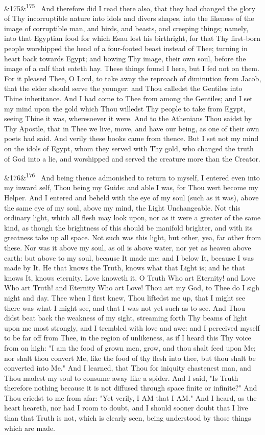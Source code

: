 \documentclass[12pt]{article}
\newcommand{\para}[1][]{\par\noindent\ifx&#1&\else\textsuperscript{\footnotesize #1}~\fi}
\begin{document}
\para[175] And therefore did I read there also, that they had changed the glory of Thy incorruptible nature into idols and divers shapes, into the likeness of the image of corruptible man, and birds, and beasts, and creeping things; namely, into that Egyptian food for which Esau lost his birthright, for that Thy first-born people worshipped the head of a four-footed beast instead of Thee; turning in heart back towards Egypt; and bowing Thy image, their own soul, before the image of a calf that eateth hay. These things found I here, but I fed not on them. For it pleased Thee, O Lord, to take away the reproach of diminution from Jacob, that the elder should serve the younger: and Thou calledst the Gentiles into Thine inheritance. And I had come to Thee from among the Gentiles; and I set my mind upon the gold which Thou willedst Thy people to take from Egypt, seeing Thine it was, wheresoever it were. And to the Athenians Thou saidst by Thy Apostle, that in Thee we live, move, and have our being, as one of their own poets had said. And verily these books came from thence. But I set not my mind on the idols of Egypt, whom they served with Thy gold, who changed the truth of God into a lie, and worshipped and served the creature more than the Creator.

\para[176] And being thence admonished to return to myself, I entered even into my inward self, Thou being my Guide: and able I was, for Thou wert become my Helper. And I entered and beheld with the eye of my soul (such as it was), above the same eye of my soul, above my mind, the Light Unchangeable. Not this ordinary light, which all flesh may look upon, nor as it were a greater of the same kind, as though the brightness of this should be manifold brighter, and with its greatness take up all space. Not such was this light, but other, yea, far other from these. Nor was it above my soul, as oil is above water, nor yet as heaven above earth: but above to my soul, because It made me; and I below It, because I was made by It. He that knows the Truth, knows what that Light is; and he that knows It, knows eternity. Love knoweth it. O Truth Who art Eternity! and Love Who art Truth! and Eternity Who art Love! Thou art my God, to Thee do I sigh night and day. Thee when I first knew, Thou liftedst me up, that I might see there was what I might see, and that I was not yet such as to see. And Thou didst beat back the weakness of my sight, streaming forth Thy beams of light upon me most strongly, and I trembled with love and awe: and I perceived myself to be far off from Thee, in the region of unlikeness, as if I heard this Thy voice from on high: "I am the food of grown men, grow, and thou shalt feed upon Me; nor shalt thou convert Me, like the food of thy flesh into thee, but thou shalt be converted into Me." And I learned, that Thou for iniquity chastenest man, and Thou madest my soul to consume away like a spider. And I said, "Is Truth therefore nothing because it is not diffused through space finite or infinite?" And Thou criedst to me from afar: "Yet verily, I AM that I AM." And I heard, as the heart heareth, nor had I room to doubt, and I should sooner doubt that I live than that Truth is not, which is clearly seen, being understood by those things which are made.
\end{document}
